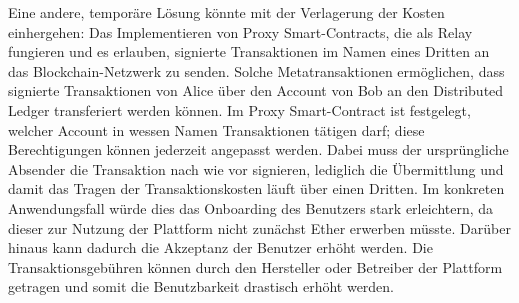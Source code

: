 Eine andere, temporäre Lösung könnte mit der Verlagerung der Kosten einhergehen: Das Implementieren von Proxy Smart-Contracts, die als Relay fungieren und es erlauben, signierte Transaktionen im Namen eines Dritten an das Blockchain-Netzwerk zu senden. Solche Metatransaktionen ermöglichen, dass signierte Transaktionen von Alice über den Account von Bob an den Distributed Ledger transferiert werden können. Im Proxy Smart-Contract ist festgelegt, welcher Account in wessen Namen Transaktionen tätigen darf; diese Berechtigungen können jederzeit angepasst werden. Dabei muss der ursprüngliche Absender die Transaktion nach wie vor signieren, lediglich die Übermittlung und damit das Tragen der Transaktionskosten läuft über einen Dritten. Im konkreten Anwendungsfall würde dies das Onboarding des Benutzers stark erleichtern, da dieser zur Nutzung der Plattform nicht zunächst Ether erwerben müsste. Darüber hinaus kann dadurch die Akzeptanz der Benutzer erhöht werden. Die Transaktionsgebühren können durch den Hersteller oder Betreiber der Plattform getragen und somit die Benutzbarkeit drastisch erhöht werden.

